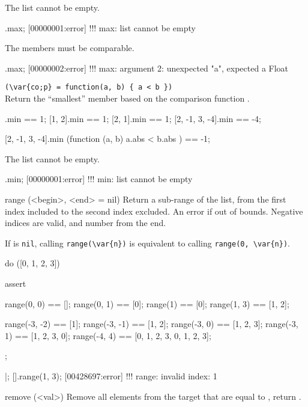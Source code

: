 \begin{urbiscriptapi}
The list cannot be empty.

\begin{urbiscript}
[].max;
[00000001:error] !!! max: list cannot be empty
\end{urbiscript}

The members must be comparable.
\begin{urbiscript}
[0, 2, "a", 1].max;
[00000002:error] !!! max: argument 2: unexpected "a", expected a Float
\end{urbiscript}


\item {}\lstinline|(\var{co;p} = function(a, b) { a < b })|\\%
  Return the ``smallest'' member based on the comparison function .
\begin{urbiassert}
           [1].min == 1;
        [1, 2].min == 1;
        [2, 1].min == 1;
[2, -1, 3, -4].min == -4;

[2, -1, 3, -4].min (function (a, b) { a.abs < b.abs }) == -1;
\end{urbiassert}

The list cannot be empty.

\begin{urbiscript}
[].min;
[00000001:error] !!! min: list cannot be empty
\end{urbiscript}


\item[range](<begin>, <end> = nil)%
  Return a sub-range of the list, from the first index included to the
  second index excluded.  An error if out of bounds.  Negative indices
  are valid, and number from the end.

  If  is \lstinline|nil|, calling \lstinline|range(\var{n})|
  is equivalent to calling \lstinline|range(0, \var{n})|.

\begin{urbiscript}
do ([0, 1, 2, 3])
{
  assert
  {
    range(0, 0)   == [];
    range(0, 1)   == [0];
    range(1)      == [0];
    range(1, 3)   == [1, 2];

    range(-3, -2) == [1];
    range(-3, -1) == [1, 2];
    range(-3, 0)  == [1, 2, 3];
    range(-3, 1)  == [1, 2, 3, 0];
    range(-4, 4)  == [0, 1, 2, 3, 0, 1, 2, 3];
  };
}|;
[].range(1, 3);
[00428697:error] !!! range: invalid index: 1
\end{urbiscript}


\item[remove](<val>)%
  Remove all elements from the target that are equal to , return
  \this.


\end{urbiscriptapi}
